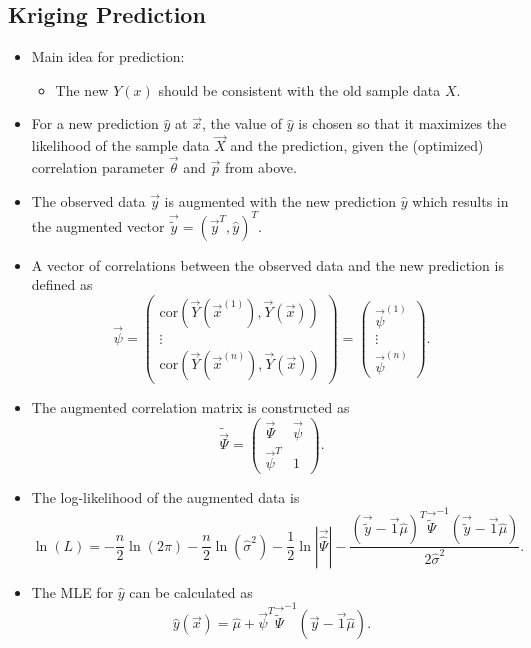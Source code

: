 \documentclass[
  letterpaper,
  DIV=11,
  numbers=noendperiod]{scrreprt}
\providecommand{\tightlist}{%
  \setlength{\itemsep}{0pt}\setlength{\parskip}{0pt}}\usepackage{longtable,booktabs,array}
\begin{document}
\hypertarget{kriging-prediction}{%
\subsection{Kriging Prediction}\label{kriging-prediction}}

\begin{itemize}
\item
  Main idea for prediction:

  \begin{itemize}
  \tightlist
  \item
    The new \(Y(x)\) should be consistent with the old sample data
    \(X\).
  \end{itemize}
\item
  For a new prediction \(\hat{y}\) at \(\vec{x}\), the value of
  \(\hat{y}\) is chosen so that it maximizes the likelihood of the
  sample data \(\vec{X}\) and the prediction, given the (optimized)
  correlation parameter \(\vec{\theta}\) and \(\vec{p}\) from above.
\item
  The observed data \(\vec{y}\) is augmented with the new prediction
  \(\hat{y}\) which results in the augmented vector
  \(\vec{\tilde{y}} = ( \vec{y}^T, \hat{y})^T\).
\item
  A vector of correlations between the observed data and the new
  prediction is defined as \begin{equation*}
  \vec{\psi} = 
  \begin{pmatrix}
  \text{cor}\left(
  \vec{Y}(\vec{x}^{(1)}),
  \vec{Y}(\vec{x}) 
  \right) \\
  \vdots  \\
  \text{cor}\left(
  \vec{Y}(\vec{x}^{(n)}),
  \vec{Y}(\vec{x}) 
  \right)
  \end{pmatrix}
  =
  \begin{pmatrix}
  \vec{\psi}^{(1)}\\
  \vdots\\
  \vec{\psi}^{(n)}
  \end{pmatrix}.
  \end{equation*}
\item
  The augmented correlation matrix is constructed as \begin{equation*}
  \tilde{\vec{\Psi}} =
  \begin{pmatrix}
  \vec{\Psi} & \vec{\psi} \\
  \vec{\psi}^T & 1
  \end{pmatrix}.
  \end{equation*}
\item
  The log-likelihood of the augmented data is
  \[\ln(L) = - \frac{n}{2} \ln(2\pi) - \frac{n}{2} \ln(\hat{\sigma}^2) - \frac{1}{2} \ln |\vec{\hat{\Psi}}| -  \frac{(\vec{\tilde{y}} - \vec{1}\hat{\mu})^T \vec{\tilde{\Psi}}^{-1}(\vec{\tilde{y}} - \vec{1}\hat{\mu})}{2 \hat{\sigma}^2}.\]
\item
  The MLE for \(\hat{y}\) can be calculated as
  \[\hat{y}(\vec{x}) = \hat{\mu} + \vec{\psi}^T \vec{\tilde{\Psi}}^{-1} (\vec{y} - \vec{1}\hat{\mu}).\]
\end{itemize}
\end{document}
